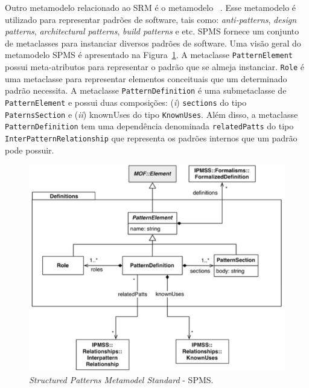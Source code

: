 Outro metamodelo relacionado ao SRM é o metamodelo ~\cite{ADM:SPMS}. Esse metamodelo é utilizado para representar padrões de software, tais como: \textit{anti-patterns}, \textit{design patterns}, \textit{architectural patterns}, \textit{build patterns} e etc. SPMS fornece um conjunto de metaclasses para instanciar diversos padrões de software. Uma visão geral do metamodelo SPMS é apresentado na Figura~\ref{fig:SPMS_metamodel_related}. A metaclasse \texttt{PatternElement} possui meta-atributos para representar o padrão que se almeja instanciar. \texttt{Role} é uma metaclasse para representar elementos conceituais que um determinado padrão necessita. A metaclasse \texttt{PatternDefinition} é uma submetaclasse de \texttt{PatternElement} e possui duas composições: (\textit{i}) \texttt{sections} do tipo \texttt{PaternsSection} e (\textit{ii}) knownUses do tipo \texttt{KnownUses}. Além disso, a metaclasse \texttt{PatternDefinition} tem uma dependência denominada \texttt{relatedPatts} do tipo \texttt{InterPatternRelationship} que representa os padrões internos que um padrão pode possuir.
 

\begin{figure}[h]
	\centering
	\caption{\textit{Structured Patterns Metamodel Standard} - SPMS.}
	\label{fig:SPMS_metamodel_related}
	\includegraphics[scale=0.57]{images/SPMS_related}
\end{figure}



